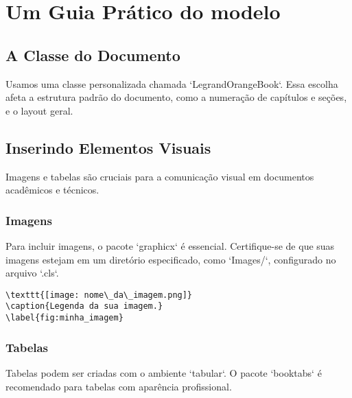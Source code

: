 \chapter{Um Guia Prático do modelo}

\section{A Classe do Documento}

Usamos uma classe personalizada chamada `LegrandOrangeBook`. Essa escolha afeta a estrutura padrão do documento, como a numeração de capítulos e seções, e o layout geral.

\section{Inserindo Elementos Visuais}

Imagens e tabelas são cruciais para a comunicação visual em documentos acadêmicos e técnicos.

\subsection{Imagens}

Para incluir imagens, o pacote `graphicx` é essencial. Certifique-se de que suas imagens estejam em um diretório especificado, como `Images/`, configurado no arquivo `.cls`.

\begin{verbatim}
\texttt{[image: nome\_da\_imagem.png]}
\caption{Legenda da sua imagem.}
\label{fig:minha_imagem}
\end{verbatim}

\subsection{Tabelas}

Tabelas podem ser criadas com o ambiente `tabular`. O pacote `booktabs` é recomendado para tabelas com aparência profissional.

